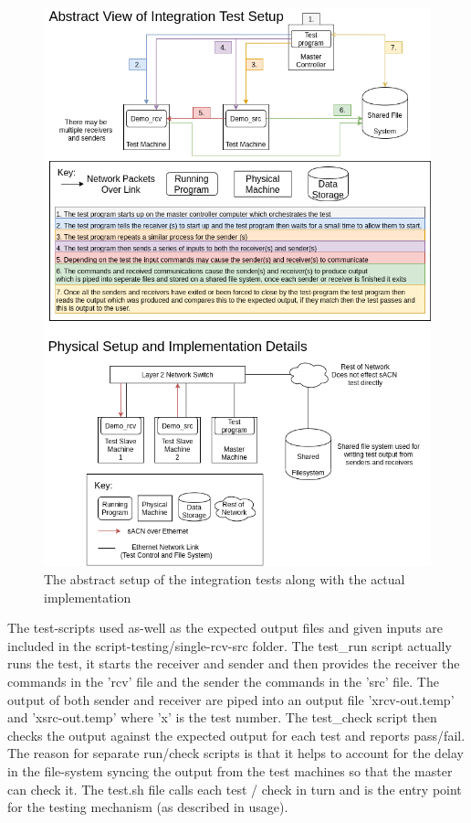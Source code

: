 \documentclass[11pt,a4paper]{article}
\begin{document}
\begin{figure}[H]
	\label{INTEGRATION_TEST_SETUP}
	\includegraphics[width=\textwidth]{SH-Project-Intergration-Tests-Abstract-View.png}
	\caption{The abstract setup of the integration tests along with the actual implementation}
\end{figure}

The test-scripts used as-well as the expected output files and given inputs are included in the script-testing/single-rcv-src folder. The test\_run script actually runs the test, it starts the receiver and sender and then provides the receiver the commands in the 'rcv' file and the sender the commands in the 'src' file. The output of both sender and receiver are piped into an output file 'xrcv-out.temp' and 'xsrc-out.temp' where 'x' is the test number. The test\_check script then checks the output against the expected output for each test and reports pass/fail. The reason for separate run/check scripts is that it helps to account for the delay in the file-system syncing the output from the test machines so that the master can check it. The test.sh file calls each test / check in turn and is the entry point for the testing mechanism (as described in usage).
\end{document}
